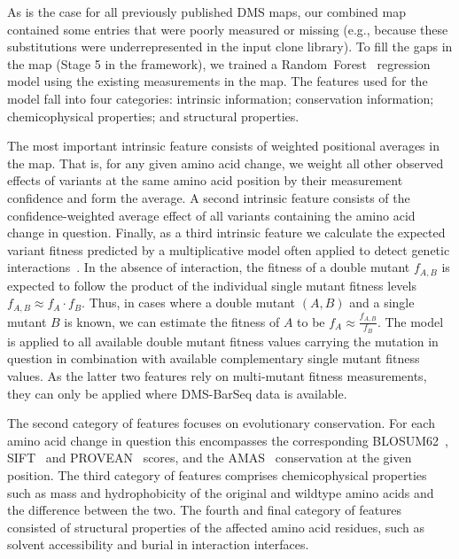 As is the case for all previously published DMS maps, our combined map contained some entries that were poorly measured or missing (e.g., because these substitutions were underrepresented in the input clone library). To fill the gaps in the map (Stage 5 in the framework), we trained a Random~Forest~\cite{breiman_random_2001} regression model using the existing measurements in the map. The features used for the model fall into four categories: intrinsic information; conservation information; chemicophysical properties; and structural properties. 

The most important intrinsic feature consists of weighted positional averages in the map. That is, for any given amino acid change, we weight all other observed effects of variants at the same amino acid position by their measurement confidence and form the average. A second intrinsic feature consists of the confidence-weighted average effect of all variants containing the amino acid change in question. Finally, as a third intrinsic feature we calculate the expected variant fitness predicted by a multiplicative model often applied to detect genetic interactions~\cite{phillips_language_1998,onge_systematic_2007}. In the absence of interaction, the fitness of a double mutant $f_{A,B}$ is expected to follow the product of the individual single mutant fitness levels $f_{A,B}\approx f_A \cdot f_B$. Thus, in cases where a double mutant $(A,B)$ and a single mutant $B$ is known, we can estimate the fitness of $A$ to be $f_A\approx \frac{f_{A,B}}{f_B}$. The model is applied to all available double mutant fitness values carrying the mutation in question in combination with available complementary single mutant fitness values. As the latter two features rely on multi-mutant fitness measurements, they can only be applied where DMS-BarSeq data is available. 

The second category of features focuses on evolutionary conservation. For each amino acid change in question this encompasses the corresponding BLOSUM62~\cite{henikoff_amino_1992}, SIFT~\cite{ng_predicting_2001} and PROVEAN~\cite{choi_predicting_2012} scores, and the AMAS~\cite{livingstone_protein_1993} conservation at the given position. The third category of features comprises chemicophysical properties such as mass and hydrophobicity of  the original and wildtype amino acids and the difference between the two. The fourth and final category of features consisted of structural properties of the affected amino acid residues, such as solvent accessibility and burial in interaction interfaces.

